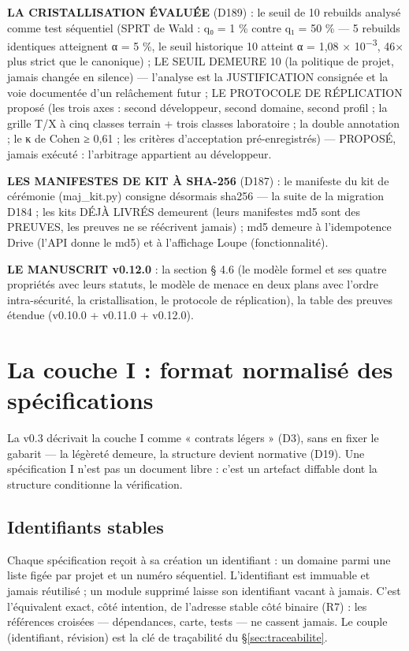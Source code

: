 \textbf{LA CRISTALLISATION ÉVALUÉE} (D189) : le seuil de 10 rebuilds
analysé comme test séquentiel (SPRT de Wald : q₀ = 1 \% contre q₁ = 50 \%
— 5 rebuilds identiques atteignent α = 5 \%, le seuil historique 10
atteint α = 1,08 × 10\textsuperscript{−3}, 46× plus strict que le
canonique) ; LE SEUIL DEMEURE 10 (la politique de projet, jamais changée
en silence) — l'analyse est la JUSTIFICATION consignée et la voie
documentée d'un relâchement futur ; LE PROTOCOLE DE RÉPLICATION proposé
(les trois axes : second développeur, second domaine, second profil ;
la grille T/X à cinq classes terrain + trois classes laboratoire ; la
double annotation ; le κ de Cohen ≥ 0,61 ; les critères d'acceptation
pré-enregistrés) — PROPOSÉ, jamais exécuté : l'arbitrage appartient au
développeur.

\textbf{LES MANIFESTES DE KIT À SHA-256} (D187) : le manifeste du kit de
cérémonie (maj\_kit.py) consigne désormais sha256 — la suite de la
migration D184 ; les kits DÉJÀ LIVRÉS demeurent (leurs manifestes md5
sont des PREUVES, les preuves ne se réécrivent jamais) ; md5 demeure à
l'idempotence Drive (l'API donne le md5) et à l'affichage Loupe
(fonctionnalité).

\textbf{LE MANUSCRIT v0.12.0} : la section § 4.6 (le modèle formel et
ses quatre propriétés avec leurs statuts, le modèle de menace en deux
plans avec l'ordre intra-sécurité, la cristallisation, le protocole de
réplication), la table des preuves étendue (v0.10.0 + v0.11.0 + v0.12.0).

\section{La couche I : format normalisé des spécifications}\label{sec:coucheI}

La v0.3 décrivait la couche I comme « contrats légers » (D3), sans en fixer le gabarit —
la légèreté demeure, la structure devient normative (D19). Une spécification I n’est pas un
document libre : c’est un artefact diffable dont la structure conditionne la vérification.

\subsection{Identifiants stables}

Chaque spécification reçoit à sa création un identifiant  : un domaine
parmi une liste figée par projet et un numéro séquentiel. L’identifiant est immuable et
jamais réutilisé ; un module supprimé laisse son identifiant vacant à jamais. C’est
l’équivalent exact, côté intention, de l’adresse stable côté binaire (R7) : les références
croisées — dépendances, carte, tests — ne cassent jamais. Le couple (identifiant,
révision) est la clé de traçabilité du §\ref{sec:traceabilite}.

